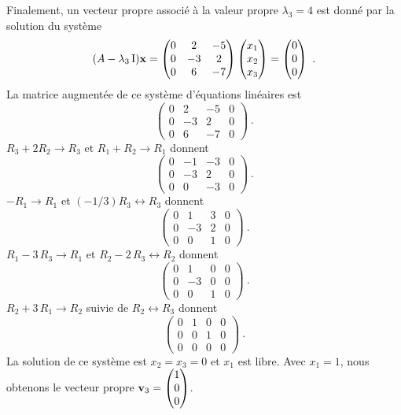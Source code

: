 {Finalement, un vecteur propre
associé à la valeur propre $\lambda_3 = 4$ est donné par la solution
du système
\[
(A-\lambda_3\operatorname{I})\mathbf{x} = 
\begin{pmatrix}
0 & 2 & -5 \\ 0 & -3 & 2 \\ 0 & 6 & -7
\end{pmatrix}
\begin{pmatrix} x_1 \\ x_2 \\ x_3 \end{pmatrix}
=
\begin{pmatrix} 0 \\ 0 \\ 0 \end{pmatrix} \ .
\]
La matrice augmentée de ce système d'équations linéaires est
\[
\left(\begin{array}{ccc|c}
0 & 2 & -5 & 0 \\ 0 & -3 & 2 & 0 \\ 0 & 6 & -7 & 0
\end{array}\right) \ .
\]
$R_3+2R_2 \rightarrow R_3$ et $R_1+R_2 \rightarrow R_1$ donnent
\[
\left(\begin{array}{ccc|c}
0 & -1 & -3 & 0 \\ 0 & -3 & 2 & 0 \\ 0 & 0 & -3 & 0
\end{array}\right) \ .
\]
$-R_1 \rightarrow R_1$ et $(-1/3)R_3\leftrightarrow R_3$ donnent
\[
\left(\begin{array}{ccc|c}
0 & 1 & 3 & 0 \\ 0 & -3 & 2 & 0 \\ 0 & 0 & 1 & 0
\end{array}\right) \ .
\]
$R_1-3\,R_3 \rightarrow R_1$ et $R_2-2\,R_3 \leftrightarrow R_2$
donnent
\[
\left(\begin{array}{ccc|c}
0 & 1 & 0 & 0 \\ 0 & -3 & 0 & 0 \\ 0 & 0 & 1 & 0
\end{array}\right) \ .
\]
$R_2+3\,R_1 \rightarrow R_2$ suivie de $R_2\leftrightarrow R_3$
donnent
\[
\left(\begin{array}{ccc|c}
0 & 1 & 0 & 0 \\ 0 & 0 & 1 & 0 \\ 0 & 0 & 0 & 0
\end{array}\right) \ .
\]
La solution de ce système est $x_2=x_3=0$ et $x_1$ est libre.  Avec $x_1=1$,
nous obtenons le vecteur propre
$\displaystyle \mathbf{v}_3 = \begin{pmatrix} 1 \\ 0 \\ 0 \end{pmatrix}$.

}
